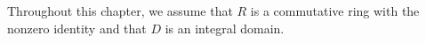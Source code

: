 Throughout this chapter, we assume that $R$ is a commutative ring with the nonzero identity and that $D$ is an integral domain.